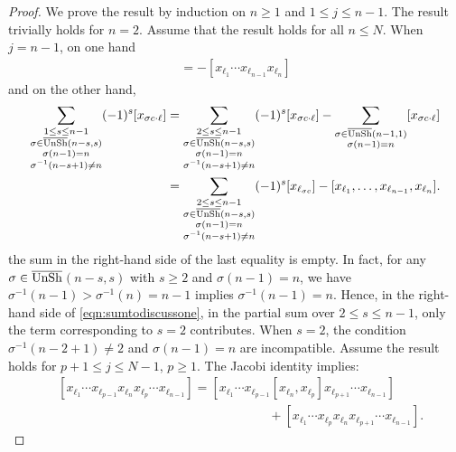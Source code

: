 \documentclass[12pt]{article}
\begin{document}
\begin{proof} We prove the result by induction on $n\geq 1$ and $1\leq j \leq n-1$. The result trivially holds for $n=2$. Assume that the result holds for all $n\leq N$. When $j=n-1$, on one hand
\begin{align}
[x_{\ell_1}\cdots x_{\ell_n}x_{\ell_{n-1}}] = -[x_{\ell_1}\cdots x_{\ell_{n-1}}x_{\ell_n}]
\end{align}
and on the other hand, 
\begin{align}
\sum_{\substack{1\leq s \leq n-1\\ \sigma \in \overline{\rm UnSh}{(n-s,s)} \\ \sigma(n-1)=n \\ \sigma^{-1}(n-s+1)\neq n}} (-1)^{s}[x_{\sigma c\cdot \ell}] & = \sum_{\substack{2\leq s \leq n-1\\\sigma \in \overline{\rm UnSh}{(n-s,s)} \\ \sigma(n-1)=n \\ \sigma^{-1}(n-s+1)\neq n}} (-1)^{s}[x_{\sigma c\cdot \ell}] -\sum_{\substack{\sigma \in \overline{\rm UnSh}(n-1,1)\\ \sigma(n-1)=n}}[x_{\sigma c \cdot \ell}] \\ 
&= \sum_{\substack{2\leq s \leq n-1\\\sigma \in \overline{\rm UnSh}{(n-s,s)} \\ \sigma(n-1)=n \\ \sigma^{-1}(n-s+1)\neq n}} (-1)^{s}[x_{\ell_{\sigma c}}] -[x_{\ell_1},\ldots,x_{\ell_{n-1}},x_{\ell_{n}}] \label{eqn:sumtodiscussone}.
\end{align}
the sum in the right-hand side of the last equality is empty. In fact, for any $\sigma \in {\rm \overline{UnSh}}$$(n-s,s)$ with $s\geq 2$ and $\sigma(n-1)=n$, we have $\sigma^{-1}(n-1) > \sigma^{-1}(n) = n-1 $ implies $\sigma^{-1}(n-1)=n$. Hence, in the right-hand side of \eqref{eqn:sumtodiscussone}, in the partial sum over $2\leq s \leq n-1$, only the term corresponding to $s=2$ contributes. When $s=2$, the condition $\sigma^{-1}(n-2+1)\neq 2$ and $\sigma(n-1)=n$ are incompatible.
Assume the result holds for $p+1 \leq j \leq N-1$, $p\geq 1$. The Jacobi identity implies:
\begin{align*}
&[x_{\ell_1}\cdots x_{\ell_{p-1}} x_{\ell_n} x_{\ell_p} \cdots x_{\ell_{n-1}}] = [x_{\ell_1} \cdots x_{\ell_{p-1}} [x_{\ell_n},x_{\ell_p}] x_{\ell_{p+1}} \cdots x_{\ell_{n-1}}] \\ 
&\hspace{7cm}+[x_{\ell_1}\cdots x_{\ell_{p}} x_{\ell_n} x_{\ell_{p+1}} \cdots x_{\ell_{n-1}}]. 

\end{align*}$$
\end{proof}
\end{document}
